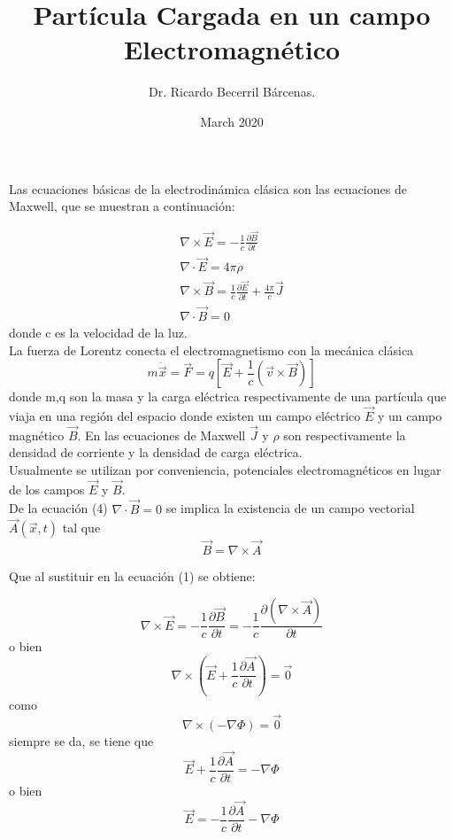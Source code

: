 \documentclass{article}
\title{Partícula Cargada en un campo Electromagnético}
\author{Dr. Ricardo Becerril Bárcenas.}
\date{March 2020}
\begin{document}
\maketitle
Las ecuaciones básicas de la electrodinámica clásica son las ecuaciones de Maxwell, que se muestran a continuación:

\begin{eqnarray}\label{eq1, eq2, eq3, eq4}
\nabla \times \vec{E} = -\frac{1}{c} \frac{\partial \vec {B}}{\partial t}\\
\nabla \cdot \vec {E}= 4\pi\rho \\
\nabla \times \vec {B} = \frac{1}{c}\frac{\partial \vec {E}}{\partial t}+\frac{4\pi}{c} \vec {J}\\
\nabla \cdot \vec {B}=0
\end{eqnarray}
donde c es la velocidad de la luz. \\
La fuerza de Lorentz conecta el electromagnetismo con la mecánica clásica
\begin{equation}\label{eq5}
    m\ddot{\vec x}= \vec F= q[\vec E+\frac{1}{c}(\vec v \times \vec B)]
\end{equation} donde m,q son la masa y la carga eléctrica respectivamente de una partícula que viaja en una región del espacio donde existen un campo eléctrico $\vec E$ y un campo magnético $\vec B$. En las ecuaciones de Maxwell $\vec J$ y $\rho$ son respectivamente la densidad de corriente y la densidad de carga eléctrica.\\ 
Usualmente se utilizan por conveniencia, potenciales electromagnéticos en lugar de los campos $\vec E$ y $\vec B$.\\
De la ecuación (4) $\nabla\cdot\vec B= 0$ se implica la existencia de un campo vectorial  $\vec A(\vec x,t)$ tal que 
\begin{equation}\label{eq6}
\vec B=\nabla \times \vec A
\end{equation}

Que al sustituir en la ecuación (1) se obtiene:

\begin{equation*}
    \nabla \times \vec E=-\frac{1}{c}\frac{\partial \vec B}{\partial t}= -\frac{1}{c}\frac{\partial(\nabla\times\vec A)}{\partial t}
\end{equation*}
o bien 
\begin{equation*}
 \nabla \times(\vec E+ \frac{1}{c}\frac{\partial{\vec A}}{\partial t})= \vec 0   
\end{equation*} como 
\begin{equation*}
    \nabla \times (-\nabla \Phi)=\vec 0
\end{equation*} siempre se da, se tiene que
\begin{equation*}
    \vec E +\frac{1}{c}\frac{\partial \vec A}{\partial t}=-\nabla\Phi
\end{equation*} o bien 
\begin{equation}
\vec E= -\frac{1}{c} \frac{\partial \vec A}{\partial t}-\nabla\Phi
\end{equation}
\end{document}
